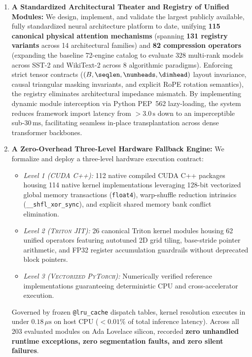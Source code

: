 \begin{enumerate}
    \item \textbf{A Standardized Architectural Theater and Registry of Unified Modules:}
    We design, implement, and validate the largest publicly available, fully standardized neural architecture platform to date, unifying \textbf{115 canonical physical attention mechanisms} (spanning \textbf{131 registry variants} across 14 architectural families) and \textbf{82 compression operators} (expanding the baseline 72-engine catalog to evaluate 328 multi-rank models across SST-2 and WikiText-2 across 8 algorithmic paradigms).
    Enforcing strict tensor contracts ($(B, \seqlen, \numheads, \dimhead)$ layout invariance, causal triangular masking invariants, and explicit RoPE rotation semantics), the registry eliminates architectural impedance mismatch.
    By implementing dynamic module interception via Python PEP~562 lazy-loading, the system reduces framework import latency from $>3.0\,\text{s}$ down to an imperceptible sub-$30\,\text{ms}$, facilitating seamless in-place transplantation across dense transformer backbones.

    \item \textbf{A Zero-Overhead Three-Level Hardware Fallback Engine:}
    We formalize and deploy a three-level hardware execution contract:
    \begin{itemize}
        \item \emph{Level 1 (\textsc{CUDA C++}):} 112 native compiled CUDA C++ packages housing 114 native kernel implementations leveraging 128-bit vectorized global memory transactions (\texttt{float4}), warp-shuffle reduction intrinsics (\texttt{\_\_shfl\_xor\_sync}), and explicit shared memory bank conflict elimination.
        \item \emph{Level 2 (\textsc{Triton JIT}):} 26 canonical Triton kernel modules housing 62 unified operators featuring autotuned 2D grid tiling, base-stride pointer arithmetic, and FP32 register accumulation guardrails without deprecated block pointers.
        \item \emph{Level 3 (\textsc{Vectorized PyTorch}):} Numerically verified reference implementations guaranteeing deterministic CPU and cross-accelerator execution.
    \end{itemize}
    Governed by frozen \texttt{@lru\_cache} dispatch tables, kernel resolution executes in under \textbf{$0.18\,\mu\text{s}$} on host CPU ($<0.01\%$ of total inference latency).
    Across all 203 evaluated modules on Ada Lovelace silicon, \neuralops{} recorded \textbf{zero unhandled runtime exceptions, zero segmentation faults, and zero silent failures}.


\end{enumerate}
